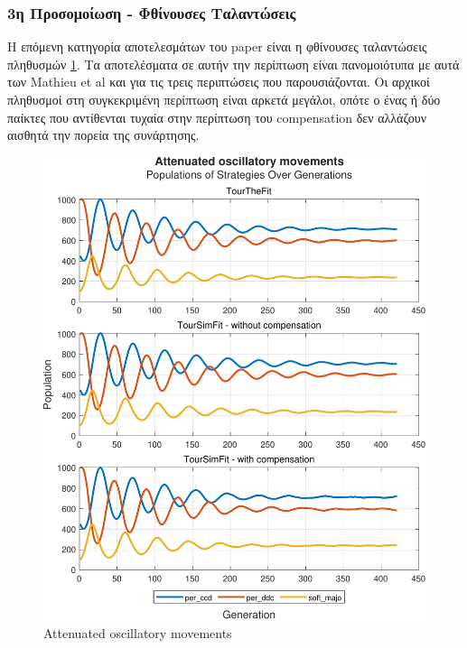 \documentclass[12pt]{article}
\begin{document}
\subsubsection{3η Προσομοίωση - Φθίνουσες Ταλαντώσεις}
Η επόμενη κατηγορία αποτελεσμάτων του paper είναι η φθίνουσες ταλαντώσεις πληθυσμών \ref{fig:Φθίνουσες Ταλαντώσεις}. Τα αποτελέσματα σε αυτήν την περίπτωση είναι πανομοιότυπα με αυτά των Mathieu et al και για τις τρεις περιπτώσεις που παρουσιάζονται. Οι αρχικοί πληθυσμοί στη συγκεκριμένη περίπτωση είναι αρκετά μεγάλοι, οπότε ο ένας ή δύο παίκτες που αντίθενται τυχαία στην περίπτωση του compensation δεν αλλάζουν αισθητά την πορεία της συνάρτησης.
	\begin{figure}[h]
	      \centering
	      \includegraphics[scale=0.8]{Attenuated oscillatory movements.pdf}
	      \caption{Attenuated oscillatory movements}
	      \label{fig:Φθίνουσες Ταλαντώσεις}
	\end{figure}
\end{document}
